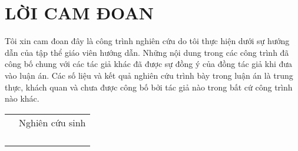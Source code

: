 \chapter*{LỜI CAM ĐOAN}
\thispagestyle{fancy}

Tôi xin cam đoan đây là công trình nghiên cứu do tôi thực hiện dưới sự hướng dẫn của tập thể giáo viên hướng dẫn. Những nội dung trong các công trình đã công bố chung với các tác giả khác đã được sự đồng ý của đồng tác giả khi đưa vào luận án. Các số liệu và kết quả nghiên cứu trình bày trong luận án là trung thực, khách quan và chưa được công bố bởi tác giả nào trong bất cứ công trình nào khác.\\

\begin{tabular}{p{9cm} c}
	& Nghiên cứu sinh\\
	& \\
	& \\
	& \\
	& \;\\
\end{tabular}
\cleardoublepage
%
%
%
%
